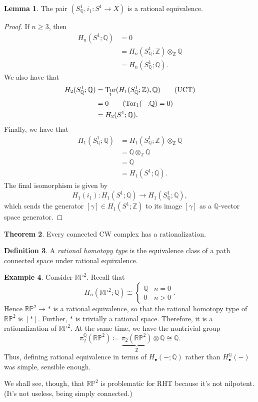 \documentclass[10pt,letterpaper,cm]{nupset}
\theoremstyle{definition}
\newtheorem{defn}{Definition}[subsection]
\newtheorem{exmp}[defn]{Example}
\theoremstyle{theorem}
\newtheorem{theorem}[defn]{Theorem}
\newtheorem{lemma}[defn]{Lemma}
\theoremstyle{remark}
\newcommand{\Q}{\mathbb Q}
\newcommand{\RP}{\mathbb{RP}}
\newcommand{\Z}{\mathbb Z}
\newcommand{\1}{\mathbb{1}}
\newcommand{\0}{\vec 0}
\DeclareMathOperator{\tor}{Tor}
\begin{document}
\begin{lemma}
The pair $\left(S^1_{\Q}, i_1 :S^1 \to X\right)$ is a rational equivalence. 
\end{lemma}
\begin{proof}
If $n\geq 3$, then 
\begin{align*}
H_n(S^1;\Q) & =0
\\ & = H_n(S^1_{\Q}; \Z) \otimes_{\Z} \Q 
\\ & = H_n(S^1_{\Q};\Q) \tag{UCT}
.\end{align*}
We also have that
\begin{align*}
H_2(S^1_{\Q}; \Q)  
 & = \tor_1(H_1(S_{\Q}^1; \Z), \Q) \tag{UCT}
\\ & = 0 \tag{$\tor_1({-}. \Q) = 0$}
\\ & = H_2(S^1; \Q).
\end{align*}
Finally, we have that
\begin{align*}
H_1(S_{\Q}^1; \Q) & = H_1(S_{\Q}^1; \Z) \otimes_{\Z} \Q \tag{UCT}
\\ & = \Q \otimes_{\Z} \Q 
\\ & = \Q
\\ &=  H_1(S^1;\Q). 
\end{align*}
The final isomorphism is given by
\[
H_1(i_1) : H_1(S^1;\Q) \to H_1(S_{\Q}^1; \Q)
,\]
which sends the generator $\left[\gamma\right] \in H_1(S^1;\Z)$ to its image $\left[\gamma\right]$ as a $\Q$-vector space generator. 
\end{proof}

\begin{theorem}
Every connected CW complex has a rationalization.
\end{theorem}

\begin{defn}
A \textit{rational homotopy type} is the equivalence class of a path connected space under rational equivalence. 
\end{defn}

\begin{exmp}
Consider $\RP^2$. Recall that
\[
H_n(\RP^2; \Q) \cong \begin{cases} \Q & n= 0
\\ 0 &  n > 0
\end{cases}
.\]
Hence $\RP^2 \to \ast$ is a rational equivalence, so that the rational homotopy type of $\RP^2$ is $\left[\ast\right]$. Further, $\ast$ is trivially a rational space. Therefore, it is a rationalization of $\RP^2$. 
At the same time, we have the nontrivial group
\[
\pi_2^{\Q}(\RP^2) \coloneqq \underbrace{\pi_2(\RP^2)}_{\Z} \otimes \Q \cong \Q
.\] Thus, defining rational equivalence in terms of $H_{\bullet}({-};\Q)$ rather than $H_{\bullet}^{\Q}({-})$ was simple, sensible enough.

\medskip

We shall see, though, that $\RP^2$ is problematic for RHT because it's not nilpotent. (It's not useless, being simply connected.) 
\end{exmp}
\end{document}
